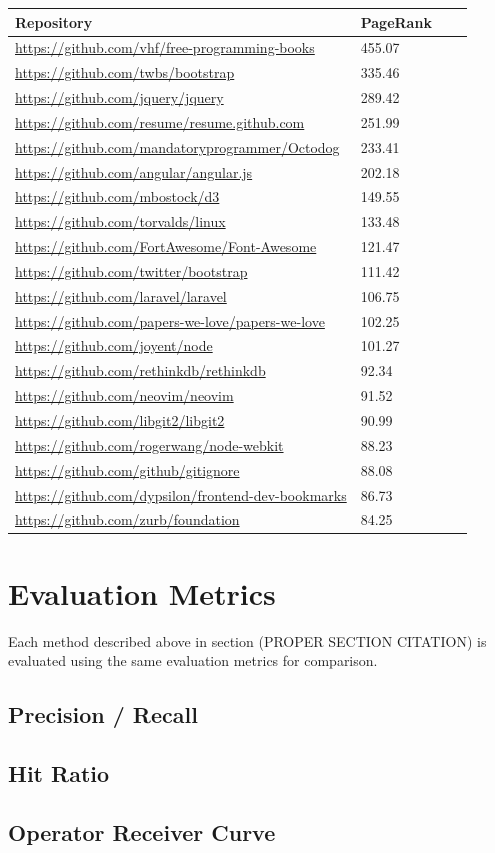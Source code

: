 \begin{table}[ht]
\centering
\small\renewcommand{\arraystretch}{1.4}  
%
\label{follow_pagerank_table}
%
\begin{tabularx}{0.8\textwidth}{lXXX}
\hline
\rowcolor{tableheadcolor}
Repository & PageRank \\
\hline
\url{https://github.com/vhf/free-programming-books} & 455.07 \\
\url{https://github.com/twbs/bootstrap} & 335.46 \\
\url{https://github.com/jquery/jquery} & 289.42 \\
\url{https://github.com/resume/resume.github.com} & 251.99 \\
\url{https://github.com/mandatoryprogrammer/Octodog} & 233.41 \\
\url{https://github.com/angular/angular.js} & 202.18 \\
\url{https://github.com/mbostock/d3} &149.55 \\
\url{https://github.com/torvalds/linux} & 133.48 \\
\url{https://github.com/FortAwesome/Font-Awesome} & 121.47 \\
\url{https://github.com/twitter/bootstrap} & 111.42 \\
\url{https://github.com/laravel/laravel} & 106.75 \\
\url{https://github.com/papers-we-love/papers-we-love} & 102.25 \\
\url{https://github.com/joyent/node} &101.27 \\
\url{https://github.com/rethinkdb/rethinkdb} & 92.34 \\
\url{https://github.com/neovim/neovim} & 91.52 \\
\url{https://github.com/libgit2/libgit2} & 90.99 \\
\url{https://github.com/rogerwang/node-webkit} & 88.23 \\
\url{https://github.com/github/gitignore} & 88.08 \\
\url{https://github.com/dypsilon/frontend-dev-bookmarks} & 86.73 \\
\url{https://github.com/zurb/foundation} & 84.25 \\
\hline
\end{tabularx}
\end{table}


\section{Evaluation Metrics}

Each method described above in section (PROPER SECTION CITATION) is evaluated using the same evaluation metrics for comparison.

\subsection{Precision / Recall}

\subsection{Hit Ratio}

\subsection{Operator Receiver Curve}

